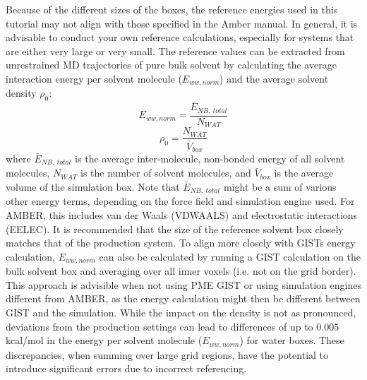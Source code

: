 \documentclass[9pt,tutorial,pubversion]{livecoms}
\begin{document}
Because of the different sizes of the boxes, the reference energies used in this tutorial may not align with those specified in the Amber manual. 
In general, it is advisable to conduct your own reference calculations, especially for systems that are either very large or very small. 
The reference values can be extracted from unrestrained MD trajectories of pure bulk solvent by calculating the average interaction energy per solvent molecule ($E_{ww, norm}$) and the average solvent density $\rho_0$:
\begin{equation}
	E_{ww, norm} = \frac{\bar{E}_{NB,\ total}}{N_{WAT}}
\end{equation}	
\begin{equation}
	\rho_0 = \frac{N_{WAT}}{\bar{V}_{box}}
\end{equation}
where $\bar{E}_{NB,\ total}$ is the average inter-molecule, non-bonded energy of all solvent molecules, $N_{WAT}$ is the number of solvent molecules, and $\bar{V}_{box}$ is the average volume of the simulation box.
Note that $\bar{E}_{NB,\ total}$ might be a sum of various other energy terms, depending on the force field and simulation engine used. For AMBER, this includes van der Waals (VDWAALS) and electrostatic interactions (EELEC).
It is recommended that the size of the reference solvent box closely matches that of the production system.
To align more closely with GISTs energy calculation, $E_{ww, norm}$ can also be calculated by running a GIST calculation on the bulk solvent box and averaging over all inner voxels (i.e. not on the grid border). 
This approach is advisible when not using PME GIST or using simulation engines different from AMBER, as the energy calculation might then be different between GIST and the simulation.
While the impact on the density is not as pronounced, deviations from the production settings can lead to differences of up to 0.005 kcal/mol in the energy per solvent molecule ($E_{ww, norm}$) for water boxes. 
These discrepancies, when summing over large grid regions, have the potential to introduce significant errors due to incorrect referencing.
\end{document}
